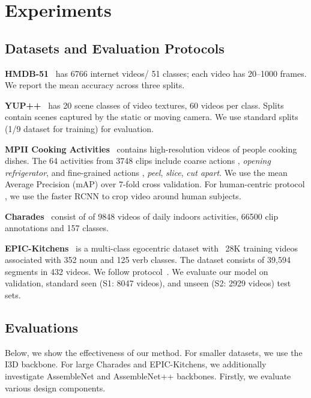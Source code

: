 \section{Experiments}
\label{sec:exper}

\subsection{Datasets and Evaluation Protocols}
\label{sec:data}

\noindent\textbf{HMDB-51}~\cite{kuehne2011hmdb} has 6766 internet videos/ 51 classes; each video has 20--1000 frames. We report the mean accuracy across three splits.

\noindent\textbf{YUP++}~\cite{yuppp}  has 20 scene classes of  video textures, 60 videos per class. Splits contain scenes captured by the static or moving camera. We use standard splits (1/9 dataset for training) for evaluation.

\noindent\textbf{MPII Cooking Activities}~\cite{rohrbach2012database} contains high-resolution videos of people cooking dishes. 
The 64  activities from 3748 clips include coarse actions \eg, \emph{opening refrigerator}, and fine-grained actions \eg, \emph{peel}, \emph{slice}, \emph{cut apart}. We use the mean Average Precision (mAP) over 7-fold cross validation. For human-centric protocol \cite{anoop_generalized, anoop_rankpool_nonlin}, we use the faster RCNN \cite{faster-rcnn} to crop video around human subjects.

\noindent\textbf{Charades}~\cite{sigurdsson2016hollywood} consist of of 9848 videos of daily indoors activities, 66500 clip annotations and 157 classes.

\noindent\textbf{EPIC-Kitchens}~\cite{Damen_2018_ECCV} is a multi-class egocentric dataset with ~28K training videos associated with 352 noun and 125 verb classes. The dataset consists of 39,594 segments in 432 videos. 
We follow protocol~\cite{Baradel_2018_ECCV}. We evaluate our model on validation, standard seen (S1: 8047 videos), and unseen (S2: 2929 videos) test sets. 


\subsection{Evaluations}
\label{sec:evals}
Below, we show the effectiveness of our method. For smaller datasets, we use the I3D backbone. For  large Charades and EPIC-Kitchens, we additionally investigate  AssembleNet and AssembleNet++ backbones.    Firstly, we evaluate various design components.


